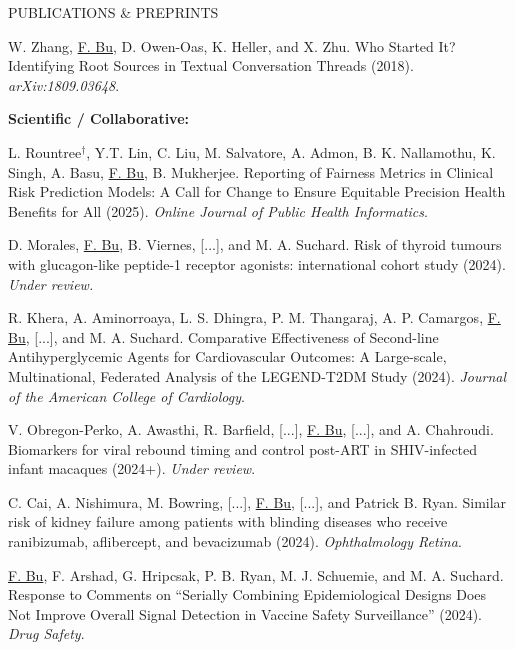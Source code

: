 \documentclass{resume} %
\newcommand{\myName}[1]{\underline{#1}}
\begin{document}
\begin{rSection}{PUBLICATIONS \& PREPRINTS}
\smallskip

W. Zhang, \myName{F. Bu}, D. Owen-Oas, K. Heller, and X. Zhu. 
Who Started It? Identifying Root Sources in Textual Conversation Threads (2018). \emph{arXiv:1809.03648}.

\medskip

\hspace{-.2in} \textbf{Scientific / Collaborative:}

% 

L. Rountree$^\dagger$, Y.T.  Lin, C. Liu, M. Salvatore, A.  Admon, B. K. Nallamothu, K. Singh, A. Basu, \myName{F. Bu}, B. Mukherjee. Reporting of Fairness Metrics in Clinical Risk Prediction Models: A Call for Change to Ensure Equitable Precision Health Benefits for All (2025). \emph{Online Journal of Public Health Informatics}. 

\smallskip

D. Morales, \myName{F. Bu}, B. Viernes, [...], and M. A. Suchard. Risk of thyroid tumours with glucagon-like peptide-1 receptor agonists: international cohort study (2024). \emph{Under review.} 

\smallskip 

R. Khera, A. Aminorroaya, L. S. Dhingra, P. M.  Thangaraj, A. P. Camargos, \myName{F. Bu}, [...], and M. A. Suchard. Comparative Effectiveness of Second-line Antihyperglycemic Agents for Cardiovascular Outcomes: A Large-scale, Multinational, Federated Analysis of the LEGEND-T2DM Study (2024). \emph{Journal of the American College of Cardiology}. 

\smallskip 

V. Obregon-Perko, A. Awasthi, R. Barfield, [...], \myName{F. Bu}, [...], and A. Chahroudi. Biomarkers for viral rebound timing and control post-ART in SHIV-infected infant macaques (2024+). \emph{Under review}.

\smallskip 

C. Cai, A. Nishimura, M. Bowring, [...], \myName{F. Bu}, [...], and Patrick B. Ryan. Similar risk of kidney failure among patients with blinding diseases who receive ranibizumab, aflibercept, and bevacizumab (2024). \emph{Ophthalmology Retina}.

\smallskip 

\myName{F. Bu}, F. Arshad, G. Hripcsak, P. B. Ryan, M. J. Schuemie, and M. A. Suchard. Response to Comments on ``Serially Combining Epidemiological Designs Does Not Improve Overall Signal Detection in Vaccine Safety Surveillance'' (2024). \emph{Drug Safety}. 


\end{rSection}
\end{document}
